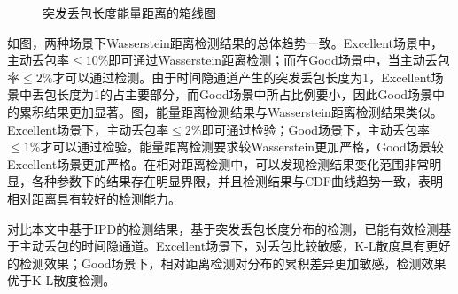 {	\begin{figure}[htbp]
        \centering
        \caption{突发丢包长度能量距离的箱线图}
        \label{fig:3:result:burst:ed}
	\end{figure}
}

如图，两种场景下Wasserstein距离检测结果的总体趋势一致。Excellent场景中，主动丢包率$\le 10\%$即可通过Wasserstein距离检测；而在Good场景中，当主动丢包率$\le 2\%$才可以通过检测。由于时间隐通道产生的突发丢包长度为1，Excellent场景中丢包长度为1的占主要部分，而Good场景中所占比例要小，因此Good场景中的累积结果更加显著。图，能量距离检测结果与Wasserstein距离检测结果类似。Excellent场景下，主动丢包率$\le 2\%$即可通过检验；Good场景下，主动丢包率$\le 1\%$才可以通过检验。能量距离检测要求较Wasserstein更加严格，Good场景较Excellent场景更加严格。在相对距离检测中，可以发现检测结果变化范围非常明显，各种参数下的结果存在明显界限，并且检测结果与CDF曲线趋势一致，表明相对距离具有较好的检测能力。

对比本文中基于IPD的检测结果，基于突发丢包长度分布的检测，已能有效检测基于主动丢包的时间隐通道。Excellent场景下，对丢包比较敏感，K-L散度具有更好的检测效果；Good场景下，相对距离检测对分布的累积差异更加敏感，检测效果优于K-L散度检测。

